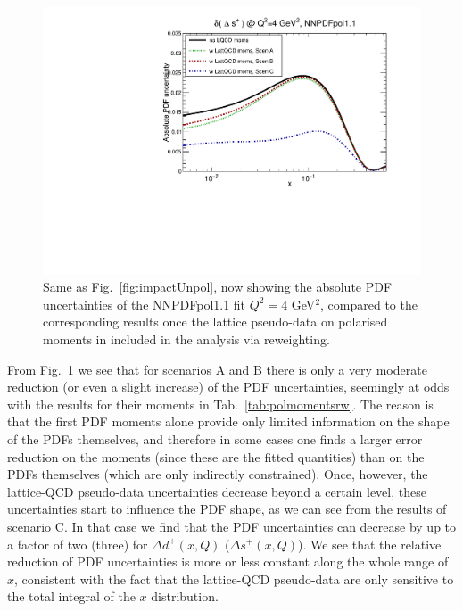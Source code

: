 \begin{figure}[!t]
\includegraphics[scale=0.45]{plots/xsp-pol-lattice-relerr.pdf}
\caption{\small Same as Fig.~\ref{fig:impactUnpol}, now
  showing the absolute PDF uncertainties of the NNPDFpol1.1 fit
   $Q^2=4$ GeV$^2$,
  compared to the corresponding results once the lattice pseudo-data
  on polarised moments in included in the analysis via
  reweighting.
}    
\label{fig:impactPol}
\end{figure}

From Fig.~\ref{fig:impactPol} we see that for scenarios
A and B there is only a very moderate reduction (or even a slight increase)
of the PDF uncertainties, seemingly at odds with the results
for their moments in Tab.~\ref{tab:polmomentsrw}.
%
The reason is that the first PDF moments alone provide only limited
information on the shape of the PDFs themselves, and therefore in some
cases one finds a larger error reduction on the moments (since these
are the fitted quantities) than on the PDFs themselves (which are
only indirectly constrained).
%
Once, however, the lattice-QCD pseudo-data uncertainties
decrease beyond a certain level, these uncertainties start to influence the PDF shape, 
as we can see from the results of scenario C.
%
In that case we find that the PDF uncertainties can decrease by up to a factor
of two (three) for $\Delta d^+(x,Q)$ ($\Delta s^+(x,Q)$).
%
We see that the relative reduction of PDF uncertainties is more
or less constant along the whole range of $x$, consistent with the fact that
the lattice-QCD pseudo-data are only sensitive to the total integral
of the $x$ distribution.
